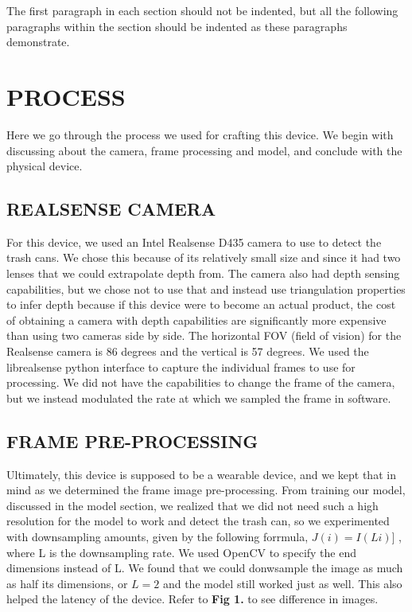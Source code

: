 \documentclass{article}
\begin{document}
The first paragraph in each section should not be indented, but all the
following paragraphs within the section should be indented as these paragraphs
demonstrate.

\section{PROCESS}
\label{sec:theprocess}

Here we go through the process we used for crafting this device. We begin with discussing about the camera, frame processing and model, and conclude with the physical device.

\subsection{REALSENSE CAMERA}
\label{ssec:realsense}

For this device, we used an Intel Realsense D435 camera to use to detect the trash cans. We chose this because of its relatively small size and since it had two lenses that we could extrapolate depth from. The camera also had depth sensing capabilities, but we chose not to use that and instead use triangulation properties to infer depth because if this device were to become an actual product, the cost of obtaining a camera with depth capabilities are significantly more expensive than using two cameras side by side. The horizontal FOV (field of vision) for the Realsense camera is 86 degrees and the vertical is 57 degrees. We used the librealsense python interface \cite{realsense} to capture the individual frames to use for processing. We did not have the capabilities to change the frame of the camera, but we instead modulated the rate at which we sampled the frame in software. 

\subsection{FRAME PRE-PROCESSING}
\label{ssec:frprep}

Ultimately, this device is supposed to be a wearable device, and we kept that in mind as we determined the frame image pre-processing. From training our model, discussed in the model section, we realized that we did not need such a high resolution for the model to work and detect the trash can, so we experimented with downsampling amounts, given by the following forrmula, $J(i) = I(Li)]$ \cite{Bovik19}, where L is the downsampling rate. We used OpenCV \cite{opencv_library} to specify the end dimensions instead of L. We found that we could donwsample the image as much as half its dimensions, or $L = 2$ and the model still worked just as well. This also helped the latency of the device. Refer to \textbf{Fig 1.} to see difference in images. 
\end{document}
